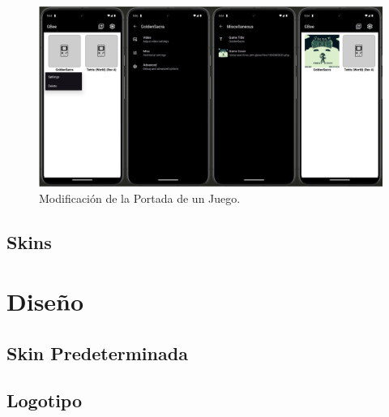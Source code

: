 \begin{figure}[H]
    \centering
    \includegraphics[width=1\textwidth]{include/images/settings_misc.png}
    \caption{Modificación de la Portada de un Juego.}\label{figure:miscFragment}
\end{figure}

\subsection{Skins}

\section{Diseño}
\subsection{Skin Predeterminada}
\subsection{Logotipo}


\cleardoublepage